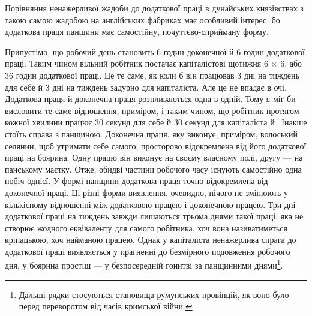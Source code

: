 
Порівняння ненажерливої жадоби до додаткової праці в дунайських
князівствах з такою самою жадобою на англійських
фабриках має особливий інтерес, бо додаткова праця панщини
має самостійну, почуттєво-сприйману форму.

Припустімо, що робочий день становить 6 годин доконечної
й 6 годин додаткової праці. Таким чином вільний робітник
постачає капіталістові щотижня 6 × 6, або 36 годин додаткової
праці. Це те саме, як коли б він працював 3 дні на тиждень для
себе й 3 дні на тиждень задурно для капіталіста. Але це не впадає
в очі. Додаткова праця й доконечна праця розпливаються одна
в одній. Тому я міг би висловити те саме відношення, приміром,
і таким чином, що робітник протягом кожної хвилини працює
30 секунд для себе й 30 секунд для капіталіста й~ Інакше
стоїть справа з панщиною. Доконечна праця, яку виконує, приміром,
волоський селянин, щоб утримати себе самого, просторово
відокремлена від його додаткової праці на боярина. Одну працю
він виконує на своєму власному полі, другу — на панському
маєтку. Отже, обидві частини робочого часу існують самостійно
одна побіч однієї. У формі панщини додаткова праця точно відокремлена
від доконечної праці. Ці різні форми виявлення, очевидно,
нічого не змінюють у кількісному відношенні між додатковою
працею і доконечною працею. Три дні додаткової праці на
тиждень завжди лишаються трьома днями такої праці, яка не
створює жодного еквіваленту для самого робітника, хоч вона
називатиметься кріпацькою, хоч найманою працею. Однак у
капіталіста ненажерлива спрага до додаткової праці виявляється
у прагненні до безмірного подовження робочого дня, у боярина
простіш — у безпосередній гонитві за панщинними днями\footnote{
Дальші рядки стосуються становища румунських провінцій, як
воно було перед переворотом від часів кримської війни.
}.

